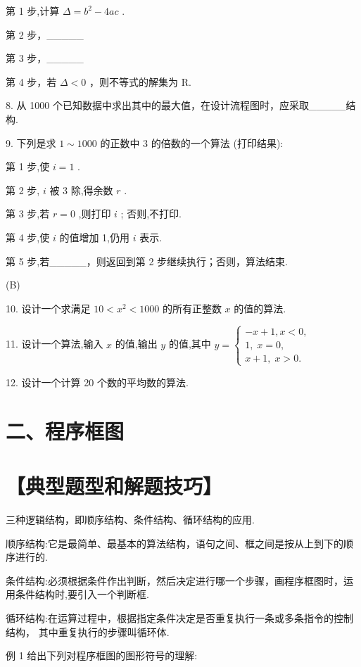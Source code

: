 \documentclass[10pt]{article}
\begin{document}
第 1 步,计算 \(\Delta  = {b}^{2} - {4ac}\) .

第 2 步，\_\_\_\_\_

第 3 步，\_\_\_\_\_

第 4 步，若 \(\Delta  < 0\) ，则不等式的解集为 R.

8. 从 1000 个已知数据中求出其中的最大值，在设计流程图时，应采取\_\_\_\_\_结构.

9. 下列是求 \(1 \sim  {1000}\) 的正数中 3 的倍数的一个算法 (打印结果):

第 1 步,使 \(i = 1\) .

第 2 步, \(i\) 被 3 除,得余数 \(r\) .

第 3 步,若 \(r = 0\) ,则打印 \(i\) ; 否则,不打印.

第 4 步,使 \(i\) 的值增加 1,仍用 \(i\) 表示.

第 5 步,若\_\_\_\_\_，则返回到第 2 步继续执行；否则，算法结束.

(B)

10. 设计一个求满足 \({10} < {x}^{2} < {1000}\) 的所有正整数 \(x\) 的值的算法.

11. 设计一个算法,输入 \(x\) 的值,输出 \(y\) 的值,其中 \(y = \left\{  \begin{array}{l}  - x + 1,x < 0, \\  1,\;x = 0, \\  x + 1,\;x > 0. \end{array}\right.\)

12. 设计一个计算 20 个数的平均数的算法.

\section*{二、程序框图}

\section*{【典型题型和解题技巧】}

三种逻辑结构，即顺序结构、条件结构、循环结构的应用.

顺序结构:它是最简单、最基本的算法结构，语句之间、框之间是按从上到下的顺序进行的.

条件结构:必须根据条件作出判断，然后决定进行哪一个步骤，画程序框图时，运用条件结构时,要引入一个判断框.

循环结构:在运算过程中，根据指定条件决定是否重复执行一条或多条指令的控制结构， 其中重复执行的步骤叫循环体.

例 1 给出下列对程序框图的图形符号的理解:
\end{document}
